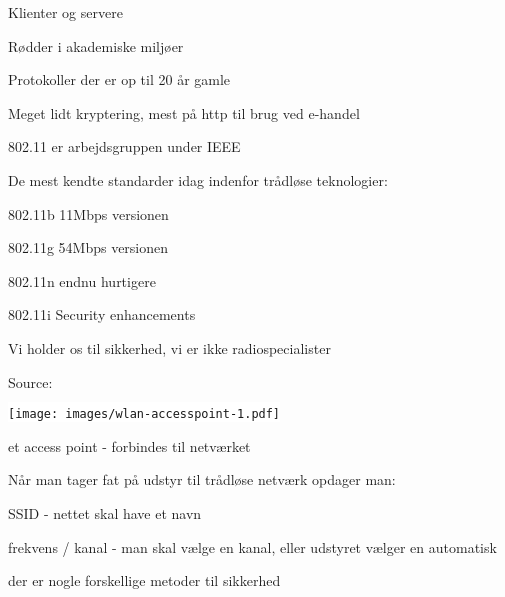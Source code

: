 \documentclass[20pt,landscape,a4paper,footrule]{foils}
\begin{document}


\begin{list1}
\item Klienter og servere
\item Rødder i akademiske miljøer
\item Protokoller der er op til 20 år gamle
\item Meget lidt kryptering, mest på http til brug ved e-handel
\end{list1}




\begin{list1}
\item 802.11 er arbejdsgruppen under IEEE
\item De mest kendte standarder idag indenfor trådløse teknologier:
\begin{list2}
\item 802.11b 11Mbps versionen
\item 802.11g 54Mbps versionen
\item 802.11n endnu hurtigere
\item 802.11i Security enhancements
\end{list2}
\end{list1}

Vi holder os til sikkerhed, vi er ikke radiospecialister \smiley

Source:
\\



\begin{center}
\colorbox{white}{\texttt{[image: images/wlan-accesspoint-1.pdf]}}
\end{center}

\centerline{\hlkbig et access point - forbindes til netværket}


\begin{list1}
\item Når man tager fat på udstyr til trådløse netværk opdager man:
\item SSID - nettet skal have et navn
\item frekvens / kanal - man skal vælge en kanal, eller udstyret
  vælger en automatisk
\item der er nogle forskellige metoder til sikkerhed
\end{list1}
\end{document}
